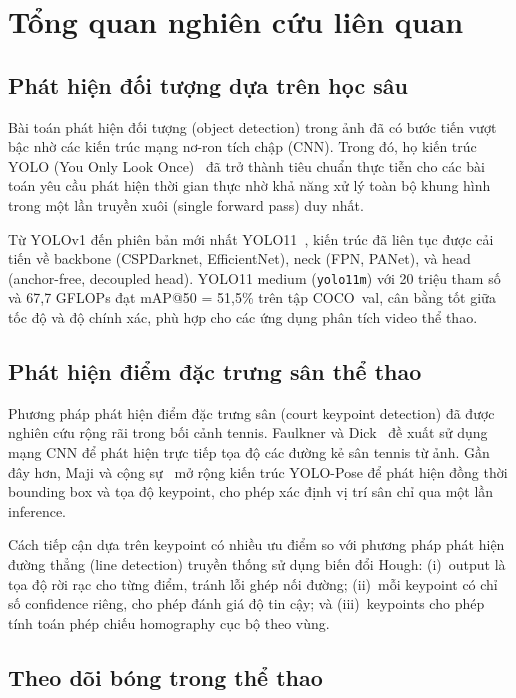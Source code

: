 \documentclass[12pt,a4paper]{article}
\begin{document}
\section{Tổng quan nghiên cứu liên quan}
\label{sec:related}

\subsection{Phát hiện đối tượng dựa trên học sâu}

Bài toán phát hiện đối tượng (object detection) trong ảnh đã có bước tiến vượt bậc nhờ các kiến trúc mạng nơ-ron tích chập (CNN). Trong đó, họ kiến trúc YOLO (You Only Look Once)~\cite{yolo2016} đã trở thành tiêu chuẩn thực tiễn cho các bài toán yêu cầu phát hiện thời gian thực nhờ khả năng xử lý toàn bộ khung hình trong một lần truyền xuôi (single forward pass) duy nhất.

Từ YOLOv1 đến phiên bản mới nhất YOLO11~\cite{ultralytics2024}, kiến trúc đã liên tục được cải tiến về backbone (CSPDarknet, EfficientNet), neck (FPN, PANet), và head (anchor-free, decoupled head). YOLO11 medium (\texttt{yolo11m}) với 20 triệu tham số và 67,7 GFLOPs đạt mAP@50 = 51,5\% trên tập COCO~val, cân bằng tốt giữa tốc độ và độ chính xác, phù hợp cho các ứng dụng phân tích video thể thao.

\subsection{Phát hiện điểm đặc trưng sân thể thao}

Phương pháp phát hiện điểm đặc trưng sân (court keypoint detection) đã được nghiên cứu rộng rãi trong bối cảnh tennis. Faulkner và Dick~\cite{faulkner2017} đề xuất sử dụng mạng CNN để phát hiện trực tiếp tọa độ các đường kẻ sân tennis từ ảnh. Gần đây hơn, Maji và cộng sự~\cite{maji2022} mở rộng kiến trúc YOLO-Pose để phát hiện đồng thời bounding box và tọa độ keypoint, cho phép xác định vị trí sân chỉ qua một lần inference.

Cách tiếp cận dựa trên keypoint có nhiều ưu điểm so với phương pháp phát hiện đường thẳng (line detection) truyền thống sử dụng biến đổi Hough: (i)~output là tọa độ rời rạc cho từng điểm, tránh lỗi ghép nối đường; (ii)~mỗi keypoint có chỉ số confidence riêng, cho phép đánh giá độ tin cậy; và (iii)~keypoints cho phép tính toán phép chiếu homography cục bộ theo vùng.

\subsection{Theo dõi bóng trong thể thao}
\end{document}
